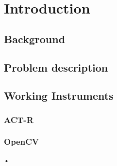 
\chapter{Introduction}
\section{Background}
\section{Problem description}
\section{Working Instruments}
\subsection{ACT-R}
\subsection{OpenCV}
	

\begin{tiny}
•
\end{tiny}